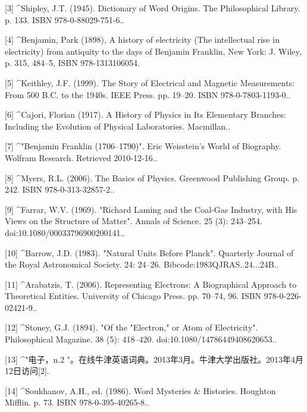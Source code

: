 [3]
^Shipley, J.T. (1945). Dictionary of Word Origins. The Philosophical Library. p. 133. ISBN 978-0-88029-751-6..

[4]
^Benjamin, Park (1898), A history of electricity (The intellectual rise in electricity) from antiquity to the days of Benjamin Franklin, New York: J. Wiley, p. 315, 484–5, ISBN 978-1313106054.

[5]
^Keithley, J.F. (1999). The Story of Electrical and Magnetic Measurements: From 500 B.C. to the 1940s. IEEE Press. pp. 19–20. ISBN 978-0-7803-1193-0..

[6]
^Cajori, Florian (1917). A History of Physics in Its Elementary Branches: Including the Evolution of Physical Laboratories. Macmillan..

[7]
^"Benjamin Franklin (1706–1790)". Eric Weisstein's World of Biography. Wolfram Research. Retrieved 2010-12-16..

[8]
^Myers, R.L. (2006). The Basics of Physics. Greenwood Publishing Group. p. 242. ISBN 978-0-313-32857-2..

[9]
^Farrar, W.V. (1969). "Richard Laming and the Coal-Gas Industry, with His Views on the Structure of Matter". Annals of Science. 25 (3): 243–254. doi:10.1080/00033796900200141..

[10]
^Barrow, J.D. (1983). "Natural Units Before Planck". Quarterly Journal of the Royal Astronomical Society. 24: 24–26. Bibcode:1983QJRAS..24...24B..

[11]
^Arabatzis, T. (2006). Representing Electrons: A Biographical Approach to Theoretical Entities. University of Chicago Press. pp. 70–74, 96. ISBN 978-0-226-02421-9..

[12]
^Stoney, G.J. (1894). "Of the "Electron," or Atom of Electricity". Philosophical Magazine. 38 (5): 418–420. doi:10.1080/14786449408620653..

[13]
^"电子，n.2 "。在线牛津英语词典。2013年3月。牛津大学出版社。2013年4月12日访问[2].

[14]
^Soukhanov, A.H., ed. (1986). Word Mysteries & Histories. Houghton Mifflin. p. 73. ISBN 978-0-395-40265-8..

